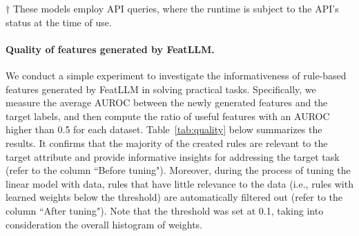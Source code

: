 \begin{table}[t!]

\centering
\caption{Comparison of training (with 16 samples) and inference (over one sample) time on Adult.}
\begin{flushleft}
$\dagger$ \small{These models employ API queries, where the runtime is subject to the API's status at the time of use. }
\end{flushleft}
\label{tab:cost}
\end{table}

\vspace*{-0.12in}
\paragraph{Quality of features generated by \textsf{FeatLLM}.}
We conduct a simple experiment to investigate the informativeness of rule-based features generated by \textsf{FeatLLM} in solving practical tasks. Specifically, we measure the average AUROC between the newly generated features and the target labels, and then compute the ratio of useful features with an AUROC higher than 0.5 for each dataset. 
Table~\ref{tab:quality} below summarizes the results. It confirms that the majority of the created rules are relevant to the target attribute and provide informative insights for addressing the target task (refer to the column ``Before tuning"). Moreover, during the process of tuning the linear model with data, rules that have little relevance to the data (i.e., rules with learned weights below the threshold) are automatically filtered out (refer to the column ``After tuning"). Note that the threshold was set at 0.1, taking into consideration the overall histogram of weights.

